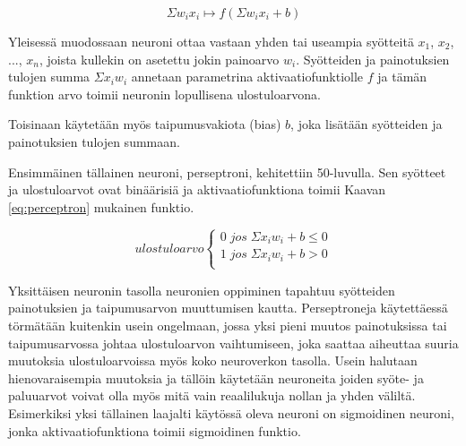 \documentclass[finnish]{tktltiki2}
\theoremstyle{definition}
\theoremstyle{remark}
\begin{document}
    \begin{equation}
      \label{eq:neuroni}
      \Sigma w_i x_i \mapsto f(\Sigma w_i x_i + b)
    \end{equation}

    Yleisessä muodossaan neuroni ottaa vastaan yhden tai useampia syötteitä $x_1$, $x_2$, ..., $x_n$, joista kullekin on asetettu jokin painoarvo $w_i$. Syötteiden ja painotuksien tulojen summa $\Sigma x_i w_i$ annetaan parametrina aktivaatiofunktiolle $f$ ja tämän funktion arvo toimii neuronin lopullisena ulostuloarvona.

    Toisinaan käytetään myös taipumusvakiota (bias) $b$, joka lisätään syötteiden ja painotuksien tulojen summaan.



    Ensimmäinen tällainen neuroni, perseptroni, kehitettiin 50-luvulla. Sen syötteet ja ulostuloarvot ovat binäärisiä ja aktivaatiofunktiona toimii Kaavan \ref{eq:perceptron} mukainen funktio.

    \begin{equation}
      \label{eq:perceptron}
      ulostuloarvo
      \begin{cases}
        0\; jos \; \Sigma x_i w_i + b \leq 0 \\
        1\; jos \; \Sigma x_i w_i + b > 0 \\
      \end{cases}
    \end{equation}

    Yksittäisen neuronin tasolla neuronien oppiminen tapahtuu syötteiden painotuksien ja taipumusarvon muuttumisen kautta. Perseptroneja käytettäessä törmätään kuitenkin usein ongelmaan, jossa yksi pieni muutos painotuksissa tai taipumusarvossa johtaa ulostuloarvon vaihtumiseen, joka saattaa aiheuttaa suuria muutoksia ulostuloarvoissa myös koko neuroverkon tasolla. Usein halutaan hienovaraisempia muutoksia ja tällöin käytetään neuroneita joiden syöte- ja paluuarvot voivat olla myös mitä vain reaalilukuja nollan ja yhden väliltä. Esimerkiksi yksi tällainen laajalti käytössä oleva neuroni on sigmoidinen neuroni, jonka aktivaatiofunktiona toimii sigmoidinen funktio.


\end{document}
